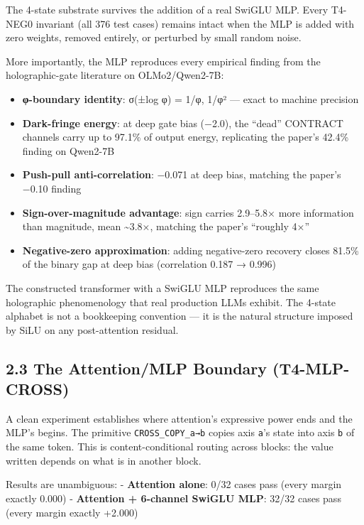 \documentclass[
  twocolumn,
  10pt,
  a4paper]{article}
\providecommand{\tightlist}{%
  \setlength{\itemsep}{0pt}\setlength{\parskip}{0pt}}
\begin{document}
The 4-state substrate survives the addition of a real SwiGLU MLP. Every
T4-NEG0 invariant (all 376 test cases) remains intact when the MLP is
added with zero weights, removed entirely, or perturbed by small random
noise.

More importantly, the MLP reproduces every empirical finding from the
holographic-gate literature on OLMo2/Qwen2-7B:

\begin{itemize}
\tightlist
\item
  \textbf{φ-boundary identity}: σ(±log φ) = 1/φ, 1/φ² --- exact to
  machine precision
\item
  \textbf{Dark-fringe energy}: at deep gate bias (−2.0), the ``dead''
  CONTRACT channels carry up to 97.1\% of output energy, replicating the
  paper's 42.4\% finding on Qwen2-7B
\item
  \textbf{Push-pull anti-correlation}: −0.071 at deep bias, matching the
  paper's −0.10 finding
\item
  \textbf{Sign-over-magnitude advantage}: sign carries 2.9--5.8× more
  information than magnitude, mean \textasciitilde3.8×, matching the
  paper's ``roughly 4×''
\item
  \textbf{Negative-zero approximation}: adding negative-zero recovery
  closes 81.5\% of the binary gap at deep bias (correlation 0.187 →
  0.996)
\end{itemize}

The constructed transformer with a SwiGLU MLP reproduces the same
holographic phenomenology that real production LLMs exhibit. The 4-state
alphabet is not a bookkeeping convention --- it is the natural structure
imposed by SiLU on any post-attention residual.

\hypertarget{the-attentionmlp-boundary-t4-mlp-cross}{%
\subsection{2.3 The Attention/MLP Boundary
(T4-MLP-CROSS)}\label{the-attentionmlp-boundary-t4-mlp-cross}}

A clean experiment establishes where attention's expressive power ends
and the MLP's begins. The primitive \texttt{CROSS\_COPY\_a→b} copies
axis \texttt{a}'s state into axis \texttt{b} of the same token. This is
content-conditional routing across blocks: the value written depends on
what is in another block.

Results are unambiguous: - \textbf{Attention alone}: 0/32 cases pass
(every margin exactly 0.000) - \textbf{Attention + 6-channel SwiGLU
MLP}: 32/32 cases pass (every margin exactly +2.000)
\end{document}
